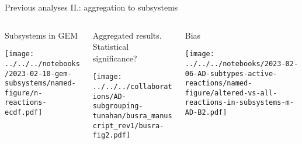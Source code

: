 \documentclass[aspectratio=169]{beamer}
\begin{document}
\begin{frame}{Previous analyses II.: aggregation to subsystems}
\begin{columns}[t]
\begin{column}{0.3\textwidth}
\begin{center}
  Subsystems in GEM
\end{center}

\texttt{[image: ../../../notebooks/2023-02-10-gem-subsystems/named-figure/n-reactions-ecdf.pdf]}
\end{column}

\begin{column}{0.4\textwidth}
\begin{center}
  Aggregated results.\\
  \scriptsize Statistical significance?
\end{center}

\texttt{[image: ../../../collaborations/AD-subgrouping-tunahan/busra\_manuscript\_rev1/busra-fig2.pdf]}
\end{column}
\begin{column}{0.3\textwidth}
\begin{center}
  Bias
\end{center}

\texttt{[image: ../../../notebooks/2023-02-06-AD-subtypes-active-reactions/named-figure/altered-vs-all-reactions-in-subsystems-m-AD-B2.pdf]}
\end{column}
\end{columns}
\end{frame}
\end{document}
